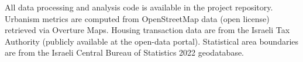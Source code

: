 \documentclass[12pt,a4paper]{article}
\begin{document}
All data processing and analysis code is available in the project repository.
Urbanism metrics are computed from OpenStreetMap data (open license) retrieved
via Overture Maps.  Housing transaction data are from the Israeli Tax Authority
(publicly available at the open-data portal).  Statistical area boundaries are
from the Israeli Central Bureau of Statistics 2022 geodatabase.



\end{document}
